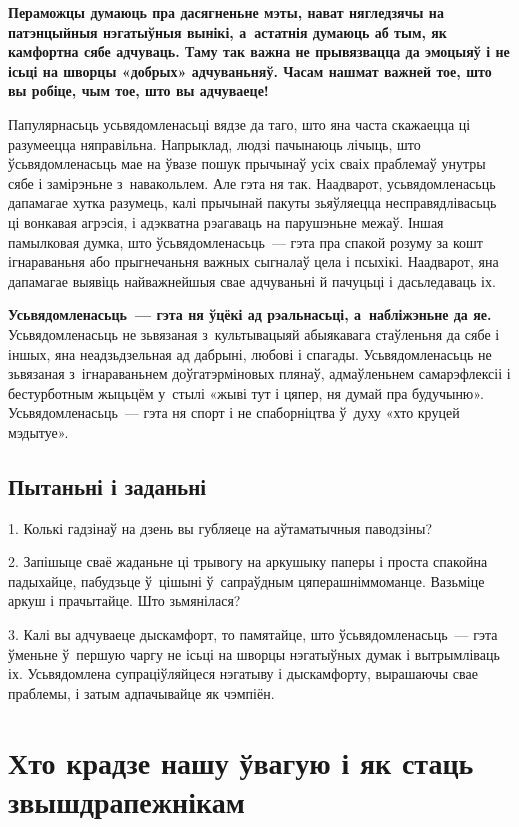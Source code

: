 \textbf{Пераможцы думаюць пра дасягненьне мэты, нават нягледзячы на патэнцыйныя нэгатыўныя вынікі, а~астатнія думаюць аб тым, як камфортна сябе адчуваць. Таму так важна не прывязвацца да эмоцыяў і не ісьці на шворцы «добрых» адчуваньняў. Часам нашмат важней тое, што вы робіце, чым тое, што вы адчуваеце!}

Папулярнасьць усьвядомленасьці вядзе да таго, што яна часта скажаецца ці разумеецца няправільна. Напрыклад, людзі пачынаюць лічыць, што ўсьвядомленасьць мае на ўвазе пошук прычынаў усіх сваіх праблемаў унутры сябе і замірэньне з~навакольлем. Але гэта ня так. Наадварот, усьвядомленасьць дапамагае хутка разумець, калі прычынай пакуты зьяўляецца несправядлівасьць ці вонкавая агрэсія, і адэкватна рэагаваць на парушэньне межаў. Іншая памылковая думка, што ўсьвядомленасьць~--- гэта пра спакой розуму за кошт ігнараваньня або прыгнечаньня важных сыгналаў цела і псыхікі. Наадварот, яна дапамагае выявіць найважнейшыя свае адчуваньні й пачуцьці і дасьледаваць іх.

\textbf{Усьвядомленасьць~--- гэта ня ўцёкі ад рэальнасьці, а~набліжэньне да яе.} Усьвядомленасьць не зьвязаная з~культывацыяй абыякавага стаўленьня да сябе і іншых, яна неадзьдзельная ад дабрыні, любові і спагады. Усьвядомленасьць не зьвязаная з~ігнараваньнем доўгатэрміновых плянаў, адмаўленьнем самарэфлексіі і бестурботным жыцьцём у~стылі «жыві тут і цяпер, ня думай пра будучыню». Усьвядомленасьць~--- гэта ня спорт і не спаборніцтва ў~духу «хто круцей мэдытуе».

\subsection*{Пытаньні і заданьні}

1. Колькі гадзінаў на дзень вы губляеце на аўтаматычныя паводзіны?

2. Запішыце сваё жаданьне ці трывогу на аркушыку паперы і проста спакойна падыхайце, пабудзьце ў~цішыні ў~сапраўдным цяперашніммоманце. Вазьміце аркуш і прачытайце. Што зьмянілася?

3. Калі вы адчуваеце дыскамфорт, то памятайце, што ўсьвядомленасьць~--- гэта ўменьне ў~першую чаргу не ісьці на шворцы нэгатыўных думак і вытрымліваць іх. Усьвядомлена супраціўляйцеся нэгатыву і дыскамфорту, вырашаючы свае праблемы, і затым адпачывайце як чэмпіён.


\section{Хто крадзе нашу ўвагую і як стаць звышдрапежнікам}


